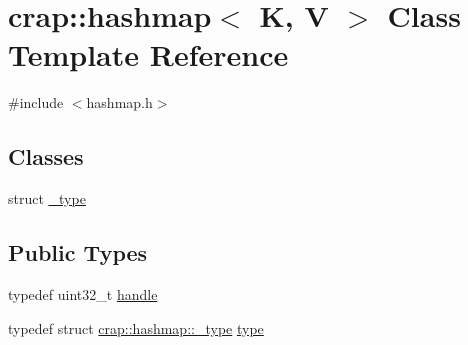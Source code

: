 \hypertarget{classcrap_1_1hashmap}{\section{crap\+:\+:hashmap$<$ K, V $>$ Class Template Reference}
\label{classcrap_1_1hashmap}
}


{\ttfamily \#include $<$hashmap.\+h$>$}

\subsection*{Classes}
\begin{DoxyCompactItemize}
\item 
struct \hyperlink{structcrap_1_1hashmap_1_1__type}{\+\_\+type}
\end{DoxyCompactItemize}
\subsection*{Public Types}
\begin{DoxyCompactItemize}
\item 
typedef uint32\+\_\+t \hyperlink{classcrap_1_1hashmap_a290dd70891131cbc14ed79c1c5aa37e5}{handle}
\item 
typedef struct \hyperlink{structcrap_1_1hashmap_1_1__type}{crap\+::hashmap\+::\+\_\+type} \hyperlink{classcrap_1_1hashmap_a017f9bcee5d676125b3a765f33fc6e11}{type}
\end{DoxyCompactItemize}
